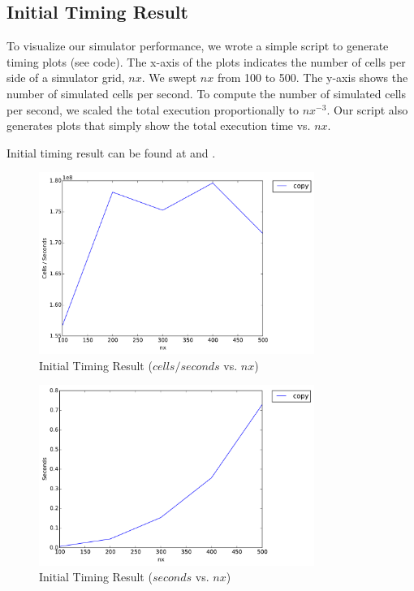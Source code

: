 \subsection{Initial Timing Result}
To visualize our simulator performance, we wrote a simple script to generate
timing plots (see  code). The x-axis of the plots indicates the
number of cells per side of a simulator grid, $nx$. We swept $nx$ from 100 to
500. The y-axis shows the number of simulated cells per second. To compute the
number of simulated cells per second, we scaled the total execution
proportionally to $nx^{-3}$. Our script also generates plots that simply show
the total execution time vs. $nx$.

Initial timing result can be found at 
and  .

\begin{figure}[h]
    \centering
    \includegraphics[width=0.8\textwidth]{figs/init-timing1.pdf}
    \caption{Initial Timing Result ($cells/seconds$ vs. $nx$)}
    \label{fig:initial_timing_result1}
\end{figure}

\begin{figure}[h]
    \centering
    \includegraphics[width=0.8\textwidth]{figs/init-timing2.pdf}
    \caption{Initial Timing Result ($seconds$ vs. $nx$)}
    \label{fig:initial_timing_result2}
\end{figure}
